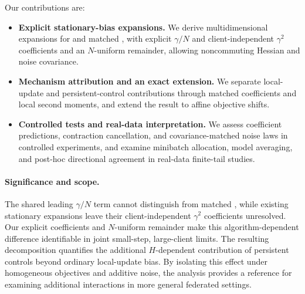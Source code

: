 Our contributions are:
\begin{itemize}
    \item \textbf{Explicit stationary-bias expansions.}
    We derive multidimensional expansions for \Scaf{} and matched
    \FedAvg{}, with explicit $\gamma/N$ and client-independent $\gamma^2$
    coefficients and an $N$-uniform remainder, allowing noncommuting
    Hessian and noise covariance.

    \item \textbf{Mechanism attribution and an exact extension.}
    We separate local-update and persistent-control contributions through
    matched coefficients and local second moments, and extend the
    \Scaf{} result to affine objective shifts.

    \item \textbf{Controlled tests and real-data interpretation.}
    We assess coefficient predictions, contraction cancellation, and
    covariance-matched noise laws in controlled experiments, and examine
    minibatch allocation, model averaging, and post-hoc directional
    agreement in real-data finite-tail studies.
\end{itemize}


\paragraph{Significance and scope.}
The shared leading $\gamma/N$ term cannot distinguish \Scaf{} from matched \FedAvg{}, while existing stationary expansions leave their client-independent $\gamma^2$ coefficients unresolved. Our explicit coefficients and $N$-uniform remainder make this algorithm-dependent difference identifiable in joint small-step, large-client limits. The resulting decomposition quantifies the additional $H$-dependent contribution of persistent controls beyond ordinary local-update bias. By isolating this effect under homogeneous objectives and additive noise, the analysis provides a reference for examining additional interactions in more general federated settings.

